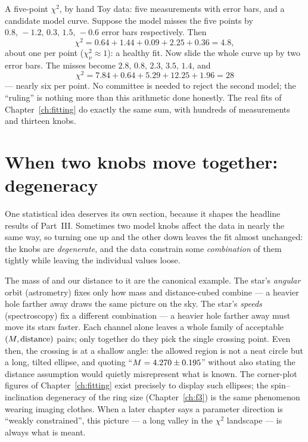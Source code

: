 \begin{worked}{A five-point $\chi^2$, by hand}
Toy data: five measurements with error bars, and a candidate model
curve. Suppose the model misses the five points by
$0.8,\,-1.2,\,0.3,\,1.5,\,-0.6$ error bars respectively. Then
\[
\chi^2 = 0.64+1.44+0.09+2.25+0.36 = 4.8,
\]
about one per point ($\chi^2_\nu \approx 1$): a healthy fit. Now slide
the whole curve up by two error bars. The misses become
$2.8,\,0.8,\,2.3,\,3.5,\,1.4$, and
\[
\chi^2 = 7.84+0.64+5.29+12.25+1.96 = 28
\]
— nearly six per point. No committee is needed to reject the second
model; the ``ruling'' is nothing more than this arithmetic done
honestly. The real fits of Chapter~\ref{ch:fitting} do exactly the
same sum, with hundreds of measurements and thirteen knobs.
\end{worked}

\section{When two knobs move together: degeneracy}

One statistical idea deserves its own section, because it shapes the
headline results of Part~III. Sometimes two model knobs affect the
data in nearly the same way, so turning one up and the other down
leaves the fit almost unchanged: the knobs are \emph{degenerate}, and
the data constrain some \emph{combination} of them tightly while
leaving the individual values loose.

The mass of \sgra{} and our distance to it are the canonical example.
The star's \emph{angular} orbit (astrometry) fixes only how mass and
distance-cubed combine — a heavier hole farther away draws the same
picture on the sky. The star's \emph{speeds} (spectroscopy) fix a
different combination — a heavier hole farther away must move its
stars faster. Each channel alone leaves a whole family of acceptable
$(M, \hbox{distance})$ pairs; only together do they pick the single
crossing point. Even then, the crossing is at a shallow angle: the
allowed region is not a neat circle but a long, tilted ellipse, and
quoting ``$M = 4.270\pm0.195$'' without also stating the
distance assumption would quietly misrepresent what is known. The
corner-plot figures of Chapter~\ref{ch:fitting} exist precisely to
display such ellipses; the spin--inclination degeneracy of the ring
size (Chapter~\ref{ch:f3}) is the same phenomenon wearing imaging
clothes. When a later chapter says a parameter direction is ``weakly
constrained'', this picture — a long valley in the $\chi^2$ landscape
— is always what is meant.

